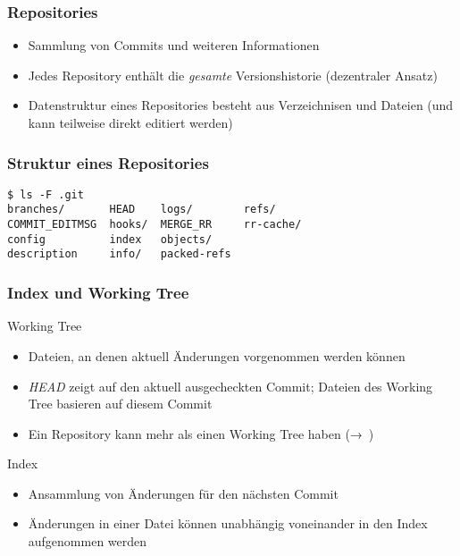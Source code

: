 \documentclass{cms-kurs}
\begin{document}
\begin{frame}
  \frametitle{Repositories}

  \onslide<+->

  \begin{itemize}
  \item Sammlung von Commits und weiteren Informationen
  \item Jedes Repository enthält die \emph{gesamte} Versionshistorie
    (dezentraler Ansatz)
  \item Datenstruktur eines Repositories besteht aus Verzeichnisen und Dateien
    (und kann teilweise direkt editiert werden)
  \end{itemize}

\end{frame}

\begin{frame}[fragile]
  \frametitle{Struktur eines Repositories}

  \onslide<+->

\begin{verbatim}
$ ls -F .git
branches/       HEAD    logs/        refs/
COMMIT_EDITMSG  hooks/  MERGE_RR     rr-cache/
config          index   objects/
description     info/   packed-refs
\end{verbatim}

\end{frame}

\begin{frame}
  \frametitle{Index und Working Tree}

  \onslide<+->

  \begin{block}{Working Tree}
    \begin{itemize}
    \item Dateien, an denen aktuell Änderungen vorgenommen werden können
    \item \emph{HEAD} zeigt auf den aktuell ausgecheckten Commit; Dateien des
      Working Tree basieren auf diesem Commit
    \item Ein Repository kann mehr als einen Working Tree haben
      (→ )
    \end{itemize}
  \end{block}

  \medskip{}

  \begin{block}{Index}
    \begin{itemize}
    \item Ansammlung von Änderungen für den nächsten Commit
    \item Änderungen in einer Datei können unabhängig voneinander in den Index
      aufgenommen werden
    \end{itemize}
  \end{block}
\end{frame}
\end{document}
